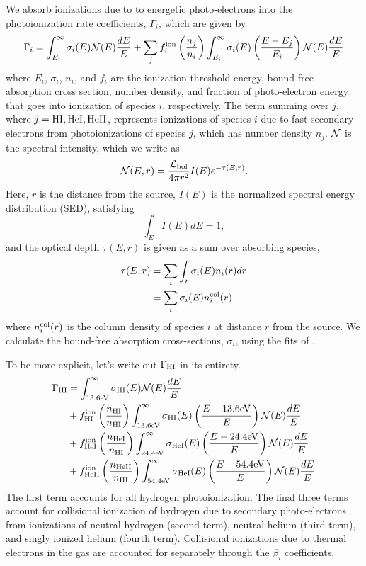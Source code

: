 \documentclass[letterpaper,titlepage,12pt]{article}
\numberwithin{equation}{section}
\begin{document}
We absorb ionizations due to to energetic photo-electrons into the
photoionization rate coefficients, $\Gamma_i$, which are given by
\begin{equation}
    \Gamma_i = \int_{E_i}^{\infty} \sigma_i(E) \mathcal{N}(E) \frac{dE}{E} + \sum_j f_i^{\text{ion}} \left(\frac{n_j}{n_i}\right) \int_{E_i}^{\infty} \sigma_i(E)\left(\frac{E - E_j}{E_i}\right) \mathcal{N}(E) \frac{dE}{E} \label{eq:PhotoionizationRate}
\end{equation}
where $E_i$, $\sigma_i$, $n_i$, and $f_i$ are the ionization threshold energy,
bound-free absorption cross section, number density, and fraction of
photo-electron energy that goes into ionization of species $i$, respectively.
The term summing over $j$, where $j = \text{HI}, \text{HeI}, \text{HeII}$, represents
ionizations of species $i$ due to fast secondary electrons from
photoionizations of species $j$, which has number density $n_j$. $\mathcal{N}$ is
the spectral intensity, which we write as
\begin{equation}
    \mathcal{N}(E, r) = \frac{\mathcal{L}_{\text{bol}}}{4\pi r^2} I(E) e^{-\tau(E, r)} . \label{eq:Spectrum}
\end{equation}
Here, $r$ is the distance from the source, $I(E)$ is the normalized spectral
energy distribution (SED), satisfying
\begin{equation}
    \int_E I(E) dE = 1 ,
\end{equation}
and the optical depth $\tau(E, r)$ is given as a sum over absorbing species,
\begin{align}
    \tau(E, r) & = \sum_i \int_r \sigma_i(E) n_i(r) dr \nonumber \\
               & = \sum_i \sigma_i(E) n_i^{\text{col}}(r) \label{eq:OpticalDepth}
\end{align}
where $n_i^{\text{col}}(r)$ is the column density of species $i$ at distance $r$ from the
source. We calculate the bound-free absorption cross-sections, $\sigma_i$,
using the fits of \cite{Verner1996}. 

To be more explicit, let's write out $\Gamma_{\text{HI}}$ in its entirety.
\begin{align}
    \Gamma_{\text{HI}} & = \int_{13.6\mathrm{eV}}^{\infty}\sigma_{\text{HI}}(E) \mathcal{N}(E) \frac{dE}{E} \nonumber \\
    & + f_{\text{HI}}^{\mathrm{ion}} \left(\frac{n_{\text{HI}}}{n_{\text{HI}}}\right) \int_{13.6\mathrm{eV}}^{\infty}\sigma_{\text{HI}}(E) \left(\frac{E - 13.6\mathrm{eV}}{E}\right)\mathcal{N}(E)\frac{dE}{E} \nonumber \\
    & + f_{\text{HeI}}^{\mathrm{ion}} \left(\frac{n_{\text{HeI}}}{n_{\text{HI}}}\right) \int_{24.4\mathrm{eV}}^{\infty}\sigma_{\text{HeI}}(E) \left(\frac{E - 24.4\mathrm{eV}}{E}\right)\mathcal{N}(E)\frac{dE}{E} \nonumber \\
    & + f_{\text{HeII}}^{\mathrm{ion}} \left(\frac{n_{\text{HeII}}}{n_{\text{HI}}}\right) \int_{54.4\mathrm{eV}}^{\infty}\sigma_{\text{HeI}}(E) \left(\frac{E - 54.4\mathrm{eV}}{E}\right)\mathcal{N}(E)\frac{dE}{E}
\end{align}    
The first term accounts for all hydrogen photoionization.  The final three terms account for collisional ionization of hydrogen due to secondary photo-electrons from ionizations of neutral hydrogen (second term), neutral helium (third term), and singly ionized helium (fourth term).  Collisional ionizations due to thermal electrons in the gas are accounted for separately through the $\beta_i$ coefficients.
\end{document}
